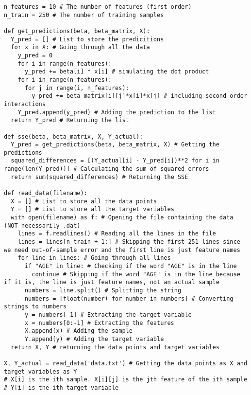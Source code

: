 \documentclass[15pt,a4paper,openright]{article}
\begin{document}
\begin{lstlisting}[language=AMPL, caption=2h Code]
n_features = 10 # The number of features (first order)
n_train = 250 # The number of training samples

def get_predictions(beta, beta_matrix, X):
  Y_pred = [] # List to store the predicitions
  for x in X: # Going through all the data
    y_pred = 0
    for i in range(n_features):
      y_pred += beta[i] * x[i] # simulating the dot product
    for i in range(n_features):
      for j in range(i, n_features):
        y_pred += beta_matrix[i][j]*x[i]*x[j] # including second order interactions
    Y_pred.append(y_pred) # Adding the prediction to the list
  return Y_pred # Returning the list

def sse(beta, beta_matrix, X, Y_actual):
  Y_pred = get_predictions(beta, beta_matrix, X) # Getting the predictions
  squared_differences = [(Y_actual[i] - Y_pred[i])**2 for i in range(len(Y_pred))] # Calculating the sum of squared errors
  return sum(squared_differences) # Returning the SSE

def read_data(filename):
  X = [] # List to store all the data points
  Y = [] # List to store all the target variables
  with open(filename) as f: # Opening the file containing the data (NOT necessarily .dat)
    lines = f.readlines() # Reading all the lines in the file
    lines = lines[n_train + 1:] # Skipping the first 251 lines since we need out-of-sample error and the first line is just feature names
    for line in lines: # Going through all lines
      if "AGE" in line: # Checking if the word "AGE" is in the line 
        continue # Skipping if the word "AGE" is in the line because if it is, the line is just feature names, not an actual sample
      numbers = line.split() # Splitting the string
      numbers = [float(number) for number in numbers] # Converting strings to numbers
      y = numbers[-1] # Extracting the target variable
      x = numbers[0:-1] # Extracting the features
      X.append(x) # Adding the sample
      Y.append(y) # Adding the target variable
  return X, Y # returning the data points and target variables

X, Y_actual = read_data('data.txt') # Getting the data points as X and target variables as Y
# X[i] is the ith sample. X[i][j] is the jth feature of the ith sample
# Y[i] is the ith target variable


\end{lstlisting}
\end{document}
